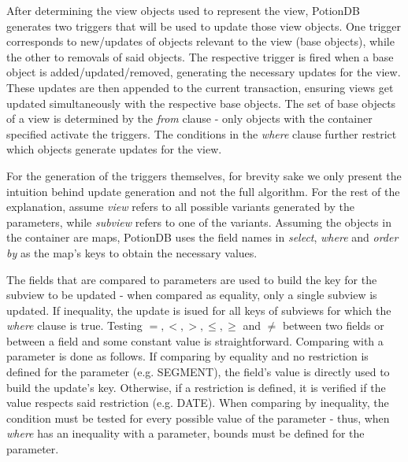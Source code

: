 \documentclass{vldb}
\begin{document}
After determining the view objects used to represent the view, PotionDB generates two triggers that will be used to update those view objects.
One trigger corresponds to new/updates of objects relevant to the view (base objects), while the other to removals of said objects.	%
The respective trigger is fired when a base object is added/updated/removed, generating the necessary updates for the view.
These updates are then appended to the current transaction, ensuring views get updated simultaneously with the respective base objects.
The set of base objects of a view is determined by the \emph{from} clause - only objects with the container specified activate the triggers.
The conditions in the \emph{where} clause further restrict which objects generate updates for the view.

For the generation of the triggers themselves, for brevity sake we only present the intuition behind update generation and not the full algorithm.
For the rest of the explanation, assume \emph{view} refers to all possible variants generated by the parameters, while \emph{subview} refers to one of the variants.
Assuming the objects in the container are maps, PotionDB uses the field names in \emph{select}, \emph{where} and \emph{order by} as the map's keys to obtain the necessary values.

The fields that are compared to parameters are used to build the key for the subview to be updated - when compared as equality, only a single subview is updated. If inequality, the update is isued for all keys of subviews for which the \emph{where} clause is true. %
Testing $=, <, >, \leq, \geq$ and $\neq$ between two fields or between a field and some constant value is straightforward. 
Comparing with a parameter is done as follows.
If comparing by equality and no restriction is defined for the parameter (e.g. SEGMENT), the field's value is directly used to build the update's key.
Otherwise, if a restriction is defined, it is verified if the value respects said restriction (e.g. DATE).
When comparing by inequality, the condition must be tested for every possible value of the parameter - thus, when \emph{where} has an inequality with a parameter, bounds must be defined for the parameter.
\end{document}
